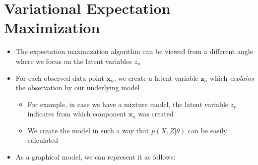 \section{Variational Expectation Maximization}

\begin{itemize}
	\item The expectation maximization algorithm can be viewed from a different angle where we focus on the latent variables $z_n$
	\item For each observed data point $\bm{x}_n$, we create a latent variable $\bm{z}_n$ which \textit{explains} the observation by our underlying model
	\begin{itemize}
		\item For example, in case we have a mixture model, the latent variable $z_n$ indicates from which component $\bm{x}_n$ was created
		\item We create the model in such a way that $p(X,Z|\theta)$ can be easily calculated
	\end{itemize}
	\item As a graphical model, we can represent it as follows:
	\begin{figure}[ht!]
		\centering
\end{figure}
\end{itemize}
